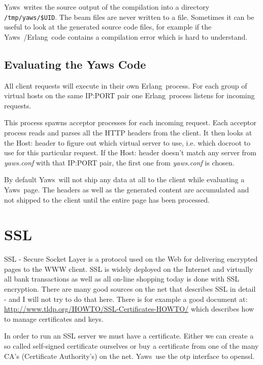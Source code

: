 \documentclass[11pt,oneside,english]{book}
\newcommand{\Erlang}            %
        {{\sc Erlang}}
\newcommand{\Yaws}            %
        {{\sc Yaws}}
\begin{document}
\Yaws\  writes the source output of the compilation into a directory
\verb+/tmp/yaws/$UID+. The beam files are never written to a file.
Sometimes it can be useful to look at the generated source code
files, for example if the \Yaws\ /\Erlang\  code contains a compilation
error which is hard to understand.


\section{Evaluating the Yaws Code}

All client requests will execute in their own \Erlang\  process.
For each group of virtual hosts on the same IP:PORT pair
one \Erlang\  process listens for incoming requests.

This process spawns acceptor processes for each incoming request.
Each acceptor process reads and parses all the HTTP headers from the
client. It then looks at the Host: header to figure out which
virtual server to use, i.e. which docroot to use for this
particular request. If the Host: header doesn't match
any server from \textit{yaws.conf} with that IP:PORT pair, the first
one from \textit{yaws.conf} is chosen.


By default \Yaws\  will not ship any data at all to the client
while evaluating a \Yaws\  page. The headers as well as the generated
content are accumulated and not shipped to the client until the
entire page has been processed.



\chapter{SSL}

SSL - Secure Socket Layer is a protocol used on the Web for
delivering encrypted pages to the WWW client. SSL is widely deployed
on the Internet and virtually all bank transactions as well as all
on-line shopping today is done with SSL encryption. There are many
good sources on the net that describes SSL in detail - and I will not
try to do that here.
There  is for example a good document at:
\url{http://www.tldp.org/HOWTO/SSL-Certificates-HOWTO/} which
describes how to manage certificates and keys.

In order to run an SSL server we must have a certificate. Either we
can create a so called self-signed certificate ourselves or buy a
certificate from one of the many CA's (Certificate Authority's) on the
net. \Yaws\  use the otp interface to openssl.
\end{document}

